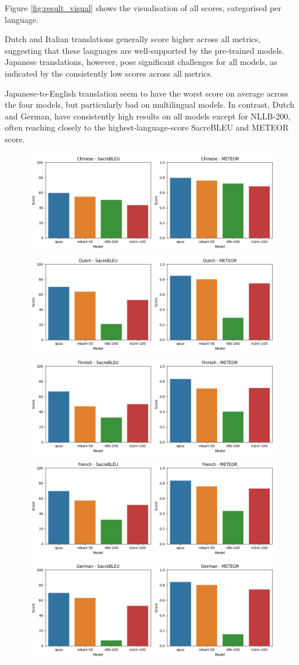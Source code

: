 \documentclass[a4paper]{article}
\begin{document}
Figure \ref{fig:result_visual} shows the visualisation of all scores, categorised per language.

Dutch and Italian translations generally score higher across all metrics, suggesting that these languages are well-supported by the pre-trained models. Japanese translations, however, pose significant challenges for all models, as indicated by the consistently low scores across all metrics.

Japanese-to-English translation seem to have the worst score on average across the four models, but particularly bad on multilingual models. In contrast, Dutch and German, have consistently high results on all models except for NLLB-200, often reaching closely to the highest-language-score SacreBLEU and METEOR score.

\begin{figure}[htbp]
    \centering
    \includegraphics[width=0.49\linewidth]{figures/chinese_all_metrics.png}
    \includegraphics[width=0.49\linewidth]{figures/dutch_all_metrics.png}
    \includegraphics[width=0.49\linewidth]{figures/finnish_all_metrics.png}
    \includegraphics[width=0.49\linewidth]{figures/french_all_metrics.png}
    \includegraphics[width=0.49\linewidth]{figures/german_all_metrics.png}

\end{figure}
\end{document}
